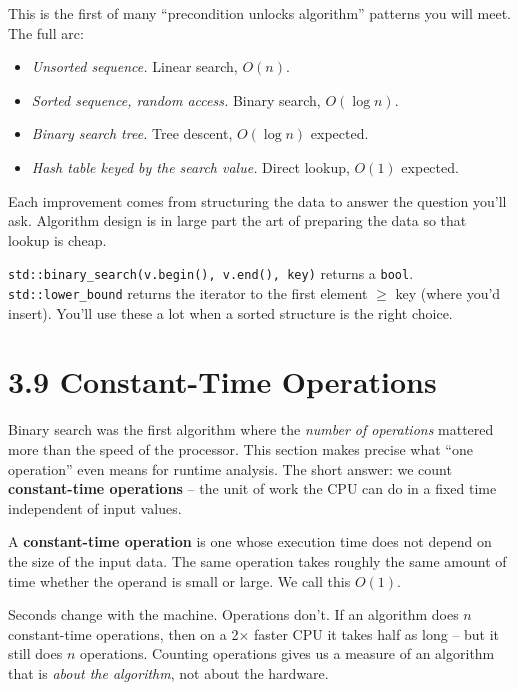 \documentclass[11pt]{article}
\begin{document}
\begin{ideabox}[Structure + precondition = algorithm]
This is the first of many ``precondition unlocks algorithm''
patterns you will meet. The full arc:
\begin{itemize}[leftmargin=*]
  \item \emph{Unsorted sequence.} Linear search, $O(n)$.
  \item \emph{Sorted sequence, random access.} Binary search, $O(\log n)$.
  \item \emph{Binary search tree.} Tree descent, $O(\log n)$ expected.
  \item \emph{Hash table keyed by the search value.} Direct lookup, $O(1)$ expected.
\end{itemize}
Each improvement comes from structuring the data to answer the
question you'll ask. Algorithm design is in large part the art of
preparing the data so that lookup is cheap.
\end{ideabox}

\begin{notebox}
\texttt{std::binary\_search(v.begin(), v.end(), key)} returns a
\texttt{bool}. \texttt{std::lower\_bound} returns the iterator to the
first element $\ge$ key (where you'd insert). You'll use these a lot
when a sorted structure is the right choice.
\end{notebox}

\section{3.9 Constant-Time Operations}

Binary search was the first algorithm where the \emph{number of
operations} mattered more than the speed of the processor. This
section makes precise what ``one operation'' even means for runtime
analysis. The short answer: we count \textbf{constant-time
operations} -- the unit of work the CPU can do in a fixed time
independent of input values.

\begin{defnbox}
A \textbf{constant-time operation} is one whose execution time does
not depend on the size of the input data. The same operation takes
roughly the same amount of time whether the operand is small or
large. We call this $O(1)$.
\end{defnbox}

\begin{ideabox}
Seconds change with the machine. Operations don't. If an algorithm
does $n$ constant-time operations, then on a 2$\times$ faster CPU it
takes half as long -- but it still does $n$ operations. Counting
operations gives us a measure of an algorithm that is \emph{about
the algorithm}, not about the hardware.
\end{ideabox}
\end{document}
